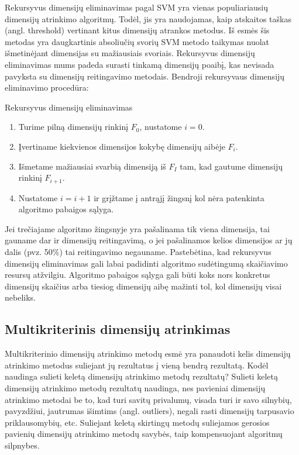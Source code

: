 Rekursyvus dimensijų eliminavimas pagal SVM yra vienas populiariausių dimensijų
atrinkimo algoritmų. Todėl, jis yra naudojamas, kaip atskaitos taškas (angl. threshold)
vertinant
kitus dimensijų atrankos metodus. Iš esmės šis metodas yra daugkartinis 
absoliučių svorių SVM metodo taikymas nuolat išmetinėjant dimensijas su 
mažiausiais svoriais. Rekursyvus dimensijų eliminavimas mums padeda surasti 
tinkamą dimensijų poaibį, kas nevisada pavyksta su dimensijų reitingavimo 
metodais. Bendroji rekursyvaus dimensijų eliminavimo procedūra:
\begin{algorithm}
\caption{Rekursyvus dimensijų eliminavimas}
\label{RFE}
 \begin{enumerate}
 \item Turime pilną dimensijų rinkinį $F_0$, nustatome $i=0$.
 \item Įvertiname kiekvienos dimensijos kokybę dimensijų aibėje $F_i$.
 \item Išmetame mažiausiai svarbią dimensiją iš $F_I$ tam, kad gautume
 dimensijų rinkinį $F_{i+1}$.
 \item Nustatome $i=i+1$ ir grįžtame į antrąjį žingsnį kol nėra patenkinta 
 algoritmo pabaigos sąlyga.
\end{enumerate}
\end{algorithm}
Jei trečiajame algoritmo žingsnyje yra pašalinama tik viena dimensija, tai gauname dar
ir dimensijų reitingavimą, o jei pašalinamos kelios dimensijos ar jų dalis
(pvz. 50\%) tai reitingavimo negauname. Pastebėtina, kad rekursyvus dimensijų
eliminavimas gali labai padidinti algoritmo sudėtingumą skaičiavimo resursų
atžvilgiu. Algoritmo pabaigos sąlyga gali būti koks nors konkretus dimensijų
skaičius arba tiesiog dimensijų aibę mažinti tol, kol dimensijų visai nebeliks.

\subsection{Multikriterinis dimensijų atrinkimas}

Multikriterinio dimensijų atrinkimo metodų esmė yra panaudoti
kelis dimensijų atrinkimo metodus suliejant jų
rezultatus į vieną bendrą rezultatą. Kodėl naudinga sulieti keletą dimensijų
atrinkimo metodų rezultatų? Sulieti keletą dimensijų atrinkimo metodų rezultatų
naudinga, nes
pavieniai dimensijų atrinkimo metodai be to, kad turi savitų privalumų, visada
turi ir savo silnybių, pavyzdžiui, jautrumas išimtims (angl. outliers), negali
rasti dimensijų tarpusavio priklausomybių, etc. Suliejant keletą skirtingų metodų
suliejamos gerosios pavienių dimensijų atrinkimo metodų savybės, taip
kompensuojant algoritmų silpnybes.

